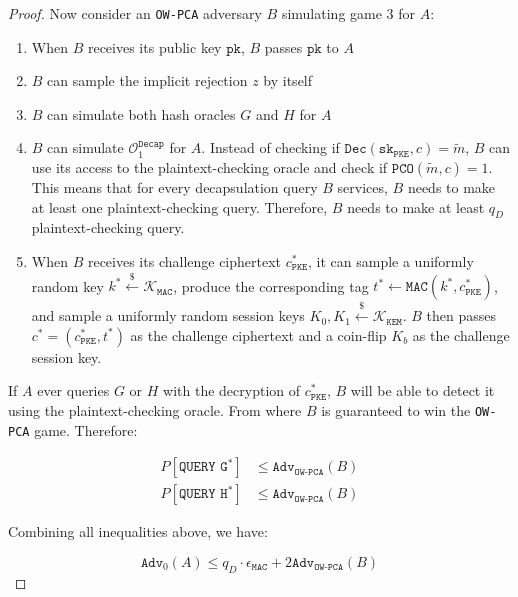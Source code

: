 \documentclass[floatrow,journal=tches,submission]{iacrtrans}
\newcommand{\pke}{\texttt{PKE}}
\newcommand{\decrypt}{\texttt{Dec}}
\newcommand{\kem}{\texttt{KEM}}
\newcommand{\decap}{\texttt{Decap}}
\newcommand{\mac}{\texttt{MAC}}
\newcommand{\pk}{\texttt{pk}}
\newcommand{\sk}{\texttt{sk}}
\newcommand{\pco}{\texttt{PCO}}
\newcommand{\leftsample}{\stackrel{\$}{\leftarrow}}
\begin{document}
\begin{proof}
    Now consider an \texttt{OW-PCA} adversary $B$ simulating game 3 for $A$: \begin{enumerate}
        \item When $B$ receives its public key $\pk$, $B$ passes $\pk$ to $A$
        \item $B$ can sample the implicit rejection $z$ by itself
        \item $B$ can simulate both hash oracles $G$ and $H$ for $A$
        \item $B$ can simulate $\mathcal{O}^\decap_1$ for $A$. Instead of checking if $\decrypt(\sk_\pke, c) = \tilde{m}$, $B$ can use its access to the plaintext-checking oracle and check if $\pco(\tilde{m}, c) = 1$. This means that for every decapsulation query $B$ services, $B$ needs to make at least one plaintext-checking query. Therefore, $B$ needs to make at least $q_D$ plaintext-checking query.
        \item When $B$ receives its challenge ciphertext $c_\pke^\ast$, it can sample a uniformly random key $k^\ast \leftsample \mathcal{K}_\mac$, produce the corresponding tag $t^\ast \leftarrow \mac(k^\ast, c^\ast_\pke)$, and sample a uniformly random session keys $K_0, K_1 \leftsample \mathcal{K}_\kem$. $B$ then passes $c^\ast = (c^\ast_\pke, t^\ast)$ as the challenge ciphertext and a coin-flip $K_b$ as the challenge session key.
    \end{enumerate}

    If $A$ ever queries $G$ or $H$ with the decryption of $c^\ast_\pke$, $B$ will be able to detect it using the plaintext-checking oracle. From where $B$ is guaranteed to win the \texttt{OW-PCA} game. Therefore:

    \begin{equation*}
        \begin{aligned}
            P[\texttt{QUERY G}^\ast] &\leq \texttt{Adv}_\texttt{OW-PCA}(B) \\
            P[\texttt{QUERY H}^\ast] &\leq \texttt{Adv}_\texttt{OW-PCA}(B)
        \end{aligned}
    \end{equation*}

    Combining all inequalities above, we have:

    \begin{equation*}
        \texttt{Adv}_0(A) \leq q_D \cdot \epsilon_\mac + 2 \texttt{Adv}_\texttt{OW-PCA}(B)
    \end{equation*}
\end{proof}
\end{document}
